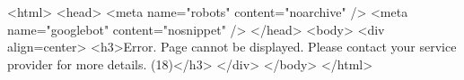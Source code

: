 <html>
<head>
<meta name="robots" content="noarchive" />
<meta name="googlebot" content="nosnippet" />
</head>
<body>
<div align=center>
<h3>Error. Page cannot be displayed. Please contact your service provider for more details.  (18)</h3>
</div>
</body>
</html>